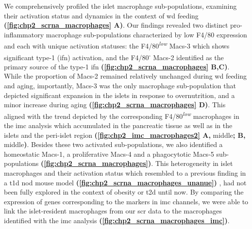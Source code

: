 \par We comprehensively profiled the islet macrophage sub-populations, examining their activation status and dynamics in the context of \gls{wd} feeding \textbf{(\autoref{fig:chp2_scrna_macrophages} A)}. Our findings revealed two distinct pro-inflammatory macrophage sub-populations characterized by low F4/80 expression and each with unique activation statuses: the F4/80\textsuperscript{\textit{low}} Macs-3 which shows significant type-1  (\gls{ifn}) activation, and the F4/80\textsuperscript{-} Macs-2 identified as the primary source of the type-1 \gls{ifn} \textbf{(\autoref{fig:chp2_scrna_macrophages} B,C)}. While the proportion of Macs-2 remained relatively unchanged during \gls{wd} feeding and aging, importantly, Macs-3 was the only macrophage sub-population that depicted significant expansion in the islets in response to overnutrition, and a minor increase during aging \textbf{(\autoref{fig:chp2_scrna_macrophages} D)}. This aligned with the trend depicted by the corresponding F4/80\textsuperscript{\textit{low}} macrophages in the \gls{imc} analysis which accumulated in the pancreatic tissue as well as in the islets and the peri-islet region \textbf{(\autoref{fig:chp2_imc_macrophages2} A,} middle\textbf{; B,} middle\textbf{)}. Besides these two activated sub-populations, we also identified a homeostatic Macs-1, a proliferative Macs-4 and a phagocytotic Macs-5 sub-populations \textbf{(\autoref{fig:chp2_scrna_macrophages})}. This heterogeneity in islet macrophages and their activation status which resembled to a previous finding in a \gls{t1d} \gls{nod} mouse model \textbf{(\autoref{fig:chp2_scrna_macrophages_unanue})} \textbf{\cite{zakharov_single-cell_2020}}, had not been fully explored in the context of obesity or \gls{t2d} until now. By comparing the expression of genes corresponding to the markers in \gls{imc} channels, we were able to link the islet-resident macrophages from our \gls{scr} data to the macrophages identified with the \gls{imc} analysis \textbf{(\autoref{fig:chp2_scrna_macrophages_imc})}.\\   %

